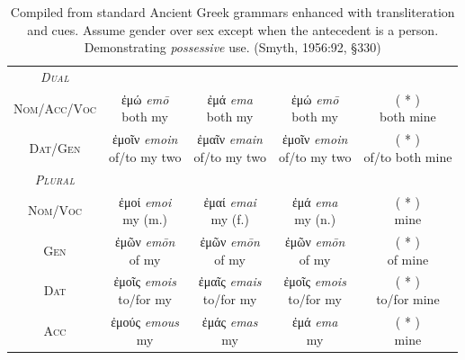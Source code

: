 \documentclass[10pt,a4paper,notitlepage]{article}
\newcommand{\tsc}[1]{\textsc{#1}}
\newcommand*{\grc}[1]{\fontspec{Inter}#1\rmfamily}
\newcommand{\trc}[1]{\textit{\fontspec{Tinos}#1}}
\begin{document}
\begin{table}[H]
\begin{tabular}{c|ccc|c}
        \hline
        \emph{\tsc{Dual}} & & & & \\
        \tsc{Nom/Acc/Voc} & \makecell{\grc{ἐμώ} \trc{emō} \\ \small both my} & \makecell{\grc{ἐμά} \trc{ema} \\ \small both my} & \makecell{\grc{ἐμώ} \trc{emō} \\ \small both my} & \makecell{( * ) \\ \small both mine} \\
        \tsc{Dat/Gen} & \makecell{\grc{ἐμοῖν} \trc{emoin} \\ \small of/to my two} & \makecell{\grc{ἐμαῖν} \trc{emain} \\ \small of/to my two} & \makecell{\grc{ἐμοῖν} \trc{emoin} \\ \small of/to my two} & \makecell{( * ) \\ \small of/to both mine} \\
        \hline
        \emph{\tsc{Plural}} & & & & \\
        \tsc{Nom/Voc} & \makecell{\grc{ἐμοί} \trc{emoi} \\ \small my (m.)} & \makecell{\grc{ἐμαί} \trc{emai} \\ \small my (f.)} & \makecell{\grc{ἐμά} \trc{ema} \\ \small my (n.)} & \makecell{( * ) \\ \small mine} \\
        \tsc{Gen} & \makecell{\grc{ἐμῶν} \trc{emōn} \\ \small of my} & \makecell{\grc{ἐμῶν} \trc{emōn} \\ \small of my} & \makecell{\grc{ἐμῶν} \trc{emōn} \\ \small of my} & \makecell{( * ) \\ \small of mine} \\
        \tsc{Dat} & \makecell{\grc{ἐμοῖς} \trc{emois} \\ \small to/for my} & \makecell{\grc{ἐμαῖς} \trc{emais}\\ \small to/for my} & \makecell{\grc{ἐμοῖς} \trc{emois} \\ \small to/for my} & \makecell{( * ) \\ \small to/for mine} \\
        \tsc{Acc} & \makecell{\grc{ἐμούς} \trc{emous} \\ \small my} & \makecell{\grc{ἐμάς} \trc{emas} \\ \small my} & \makecell{\grc{ἐμά} \trc{ema} \\ \small my} & \makecell{( * ) \\ \small mine} \\
    \end{tabular}
     \caption{Compiled from standard Ancient Greek grammars enhanced with transliteration and cues.
        Assume gender over sex except when the antecedent is a person. Demonstrating \emph{possessive} use.
         (Smyth, 1956:92, \S330)}
\end{table}
\end{document}
